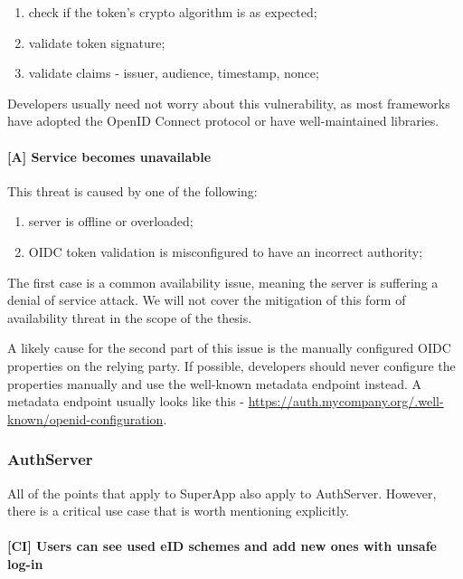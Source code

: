 \begin{enumerate}
  \item check if the token's crypto algorithm is as expected;
  \item validate token signature;
  \item validate claims - issuer, audience, timestamp, nonce;
\end{enumerate}

Developers usually need not worry about this vulnerability, as most frameworks have adopted the OpenID Connect protocol or have well-maintained libraries.

\paragraph{[A] Service becomes unavailable} This threat is caused by one of the following:

\begin{enumerate}
  \item server is offline or overloaded;
  \item OIDC token validation is misconfigured to have an incorrect authority;
\end{enumerate}

The first case is a common availability issue, meaning the server is suffering a denial of service attack. We will not cover the mitigation of this form of availability threat in the scope of the thesis.

A likely cause for the second part of this issue is the manually configured OIDC properties on the relying party. If possible, developers should never configure the properties manually and use the well-known metadata endpoint instead. A metadata endpoint usually looks like this - \url{https://auth.mycompany.org/.well-known/openid-configuration}.

\subsubsection{AuthServer}

All of the points that apply to SuperApp also apply to AuthServer. However, there is a critical use case that is worth mentioning explicitly.

\paragraph{[CI] Users can see used eID schemes and add new ones with unsafe log-in}

